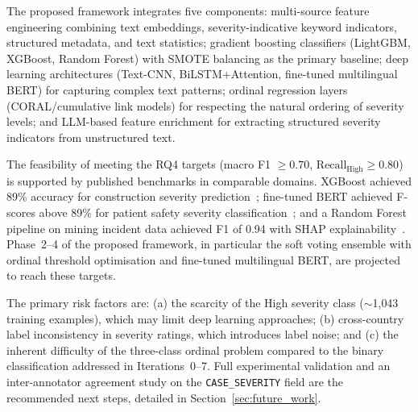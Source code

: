 \documentclass[11pt, titlepage, bibliography=totoc]{scrreprt}
\begin{document}
The proposed framework integrates five components: multi-source feature engineering combining text embeddings, severity-indicative keyword indicators, structured metadata, and text statistics; gradient boosting classifiers (LightGBM, XGBoost, Random Forest) with SMOTE balancing as the primary baseline; deep learning architectures (Text-CNN, BiLSTM+Attention, fine-tuned multilingual BERT) for capturing complex text patterns; ordinal regression layers (CORAL/cumulative link models) for respecting the natural ordering of severity levels; and LLM-based feature enrichment for extracting structured severity indicators from unstructured text.

The feasibility of meeting the RQ4 targets (macro F1 $\geq 0.70$, $\text{Recall}_\text{High} \geq 0.80$) is supported by published benchmarks in comparable domains. XGBoost achieved 89\% accuracy for construction severity prediction~\cite{SR2025}; fine-tuned BERT achieved F-scores above 89\% for patient safety severity classification~\cite{wang2025bert}; and a Random Forest pipeline on mining incident data achieved F1 of 0.94 with SHAP explainability~\cite{SD2025}. Phase~2--4 of the proposed framework, in particular the soft voting ensemble with ordinal threshold optimisation and fine-tuned multilingual BERT, are projected to reach these targets.

The primary risk factors are: (a) the scarcity of the High severity class ($\sim$1{,}043 training examples), which may limit deep learning approaches; (b) cross-country label inconsistency in severity ratings, which introduces label noise; and (c) the inherent difficulty of the three-class ordinal problem compared to the binary classification addressed in Iterations~0--7. Full experimental validation and an inter-annotator agreement study on the \texttt{CASE\_SEVERITY} field are the recommended next steps, detailed in Section~\ref{sec:future_work}.




\end{document}
